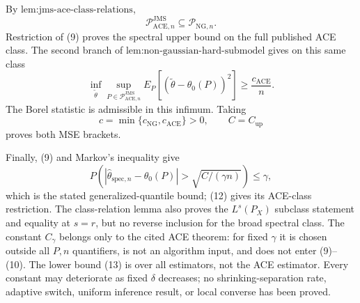 By \(\text{lem:jms-ace-class-relations}\),
\[
 \mathcal P_{\mathrm{ACE},n}^{\mathrm{JMS}}
 \subseteq\mathcal P_{\mathrm{NG},n}. \tag{12}
\]
Restriction of (9) proves the spectral upper bound on the full published ACE class.  The second branch of \(\text{lem:non-gaussian-hard-submodel}\) gives on this same class
\[
 \inf_{\widetilde\theta}
 \sup_{P\in\mathcal P_{\mathrm{ACE},n}^{\mathrm{JMS}}}
 E_P[(\widetilde\theta-\theta_0(P))^2]
 \ge\frac{c_{\mathrm{ACE}}}{n}. \tag{13}
\]
The Borel statistic is admissible in this infimum.  Taking
\[
 c=\min\{c_{\mathrm{NG}},c_{\mathrm{ACE}}\}>0,
 \qquad C=C_{\mathrm{up}}
\]
proves both MSE brackets.

Finally, (9) and Markov's inequality give
\[
 P\left(
 |\widehat\theta_{\mathrm{spec},n}-\theta_0(P)|
 >\sqrt{C/(\gamma n)}
 \right)\le\gamma,
\]
 which is the stated generalized-quantile bound; (12) gives its ACE-class restriction.  The class-relation lemma also proves the \(L^s(P_X)\) subclass statement and equality at \(s=r\), but no reverse inclusion for the broad spectral class.  The constant \(C_{\gamma}\) belongs only to the cited ACE theorem: for fixed \(\gamma\) it is chosen outside all \(P,n\) quantifiers, is not an algorithm input, and does not enter (9)--(10).  The lower bound (13) is over all estimators, not the ACE estimator.  Every constant may deteriorate as fixed \(\delta\) decreases; no shrinking-separation rate, adaptive switch, uniform inference result, or local converse has been proved.